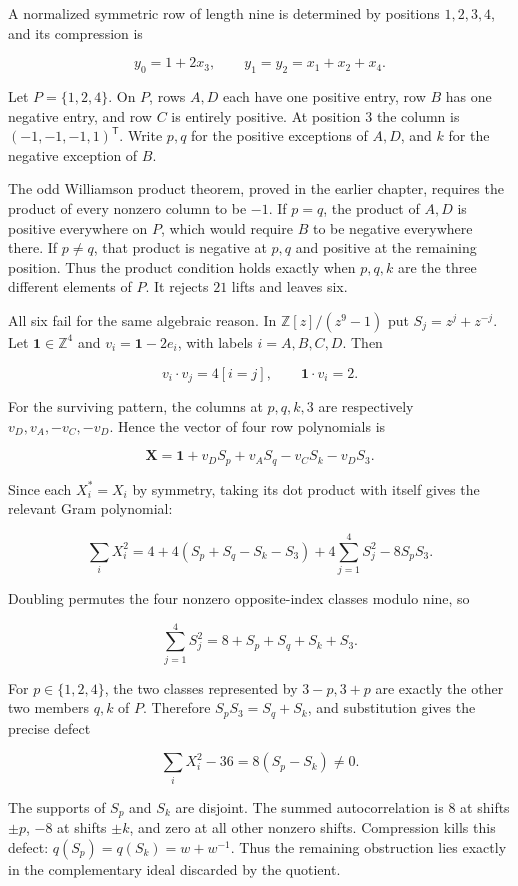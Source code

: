 \documentclass[
  11pt,
]{article}
\begin{document}
A normalized symmetric row of length nine is determined by positions
\(1,2,3,4\), and its compression is

\[y_0=1+2x_3,\qquad y_1=y_2=x_1+x_2+x_4.\]

Let \(P=\{1,2,4\}\). On \(P\), rows \(A,D\) each have one positive
entry, row \(B\) has one negative entry, and row \(C\) is entirely
positive. At position \(3\) the column is \((-1,-1,-1,1)^{\mathsf T}\).
Write \(p,q\) for the positive exceptions of \(A,D\), and \(k\) for the
negative exception of \(B\).

The odd Williamson product theorem, proved in the earlier chapter,
requires the product of every nonzero column to be \(-1\). If \(p=q\),
the product of \(A,D\) is positive everywhere on \(P\), which would
require \(B\) to be negative everywhere there. If \(p\ne q\), that
product is negative at \(p,q\) and positive at the remaining position.
Thus the product condition holds exactly when \(p,q,k\) are the three
different elements of \(P\). It rejects \(21\) lifts and leaves six.

All six fail for the same algebraic reason. In \(\mathbb Z[z]/(z^9-1)\)
put \(S_j=z^j+z^{-j}\). Let \(\mathbf1\in\mathbb Z^4\) and
\(v_i=\mathbf1-2e_i\), with labels \(i=A,B,C,D\). Then

\[v_i\cdot v_j=4[i=j],\qquad \mathbf1\cdot v_i=2.\]

For the surviving pattern, the columns at \(p,q,k,3\) are respectively
\(v_D,v_A,-v_C,-v_D\). Hence the vector of four row polynomials is

\[\mathbf X=\mathbf1+v_DS_p+v_AS_q-v_CS_k-v_DS_3.\]

Since each \(X_i^*=X_i\) by symmetry, taking its dot product with itself
gives the relevant Gram polynomial:

\[
\sum_iX_i^2
=4+4(S_p+S_q-S_k-S_3)
 +4\sum_{j=1}^4S_j^2-8S_pS_3.
\]

Doubling permutes the four nonzero opposite-index classes modulo nine,
so

\[\sum_{j=1}^4S_j^2=8+S_p+S_q+S_k+S_3.\]

For \(p\in\{1,2,4\}\), the two classes represented by \(3-p,3+p\) are
exactly the other two members \(q,k\) of \(P\). Therefore
\(S_pS_3=S_q+S_k\), and substitution gives the precise defect

\[\boxed{\ \sum_iX_i^2-36=8(S_p-S_k)\ne0.\ }\]

The supports of \(S_p\) and \(S_k\) are disjoint. The summed
autocorrelation is \(8\) at shifts \(\pm p\), \(-8\) at shifts
\(\pm k\), and zero at all other nonzero shifts. Compression kills this
defect: \(q(S_p)=q(S_k)=w+w^{-1}\). Thus the remaining obstruction lies
exactly in the complementary ideal discarded by the quotient.
\end{document}
